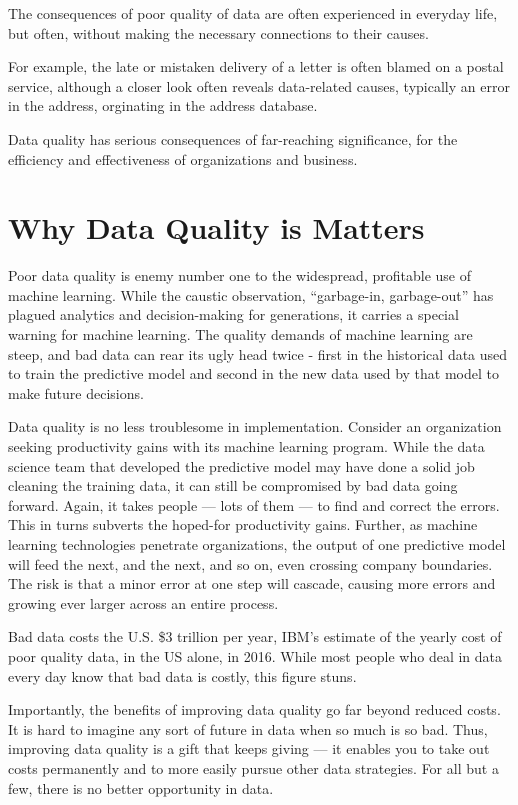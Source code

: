 The consequences of poor quality of data are often experienced in everyday life, but often, without making the necessary connections to their causes.

For example, the late or mistaken delivery of a letter is often blamed on a postal service, although  a closer look often reveals data-related causes, typically an error in the address, orginating in the address database.

Data quality has serious consequences of far-reaching significance, for the efficiency and effectiveness of organizations and business.



\section{Why Data Quality is Matters}

Poor data quality is enemy number one to the widespread, profitable use of machine learning. While the caustic observation, “garbage-in, garbage-out” has plagued analytics and decision-making for generations, it carries a special warning for machine learning. The quality demands of machine learning are steep, 
and bad data can rear its ugly head twice - first in the historical data used to train the predictive model and second in the new data used by that model to make future decisions. ~\cite{RedmanHBR2018}

Data quality is no less troublesome in implementation. Consider an organization seeking productivity gains with its machine learning program. While the data science team that developed the predictive model may have done a solid job cleaning the training data, it can still be compromised by bad data going forward. Again, it takes people — lots of them — to find and correct the errors. This in turns subverts the hoped-for productivity gains. Further, as machine learning technologies penetrate organizations, 
the output of one predictive model will feed the next, and the next, and so on, even crossing company boundaries. The risk is that a minor error at one step will cascade, causing more errors and growing ever larger across an entire process.

Bad data costs the U.S. \$3 trillion per year, IBM’s estimate of the yearly cost of poor quality data, in the US alone, in 2016. While most people who deal in data every day know that bad data is costly, this figure stuns. ~\cite{ibmInfoGraphic}


Importantly, the benefits of improving data quality go far beyond reduced costs. It is hard to imagine any sort of future in data when so much is so bad. Thus, improving data quality is a gift that keeps giving — it enables you to take out costs permanently and to more easily pursue other data strategies. 
For all but a few, there is no better opportunity in data.

